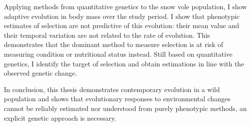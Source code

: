 \begin{summary}
Applying methods from quantitative genetics to the snow vole population, I show adaptive evolution in body mass over the study period. I show that phenotypic estimates of selection are not predictive of this evolution: their mean value and their temporal variation are not related to the rate of evolution. This demonstrates that the dominant method to measure selection is at risk of measuring condition or nutritional status instead. Still based on quantitative genetics, I identify the target of selection and obtain estimations in line with the observed genetic change. 

In conclusion, this thesis demonstrates contemporary evolution in a wild population and shows that evolutionary responses to environmental changes cannot be reliably estimated nor understood from purely phenotypic methods, an explicit genetic approach is necessary. 

\end{summary}
